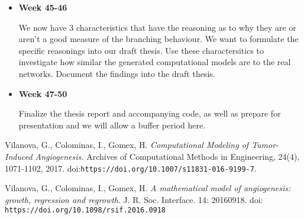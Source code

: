 \documentclass{article}
\begin{document}
\begin{itemize}
    \item \textbf{Week 45-46}

        We now have 3 characteristics that have the reasoning as to why they
        are or aren't a good measure of the branching behaviour. We want to
        formulate the specific reasonings into our draft thesis. Use these
        charactersitics to investigate how similar the generated computational
        models are to the real networks. Document the findings into the draft
        thesis.

    \item \textbf{Week 47-50}

        Finalize the thesis report and accompanying code, as well as prepare
        for presentation and we will allow a buffer period here.

\end{itemize}

\begin{thebibliography}{9}
Vilanova, G., Colominas, I., Gomex, H. \emph{Computational Modeling of Tumor-
Induced Angiogenesis.} Archives of Computational Methods in Engineering, 24(4),
1071-1102, 2017. doi:\texttt{https://doi.org/10.1007/s11831-016-9199-7}.

Vilanova, G., Colominas, I., Gomex, H. \emph{A mathematical model of angiogenesis:
growth, regression and regrowth}. J. R. Soc. Interface. 14: 20160918. doi:
\texttt{https://doi.org/10.1098/rsif.2016.0918}

\end{thebibliography}
\end{document}

